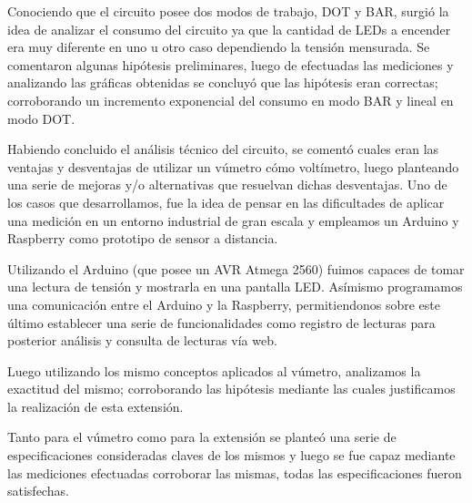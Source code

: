 \documentclass[12pt,a4paper]{article}
\begin{document}
	Conociendo que el circuito posee dos modos de trabajo, DOT y BAR, surgió la idea de analizar el consumo del circuito ya que la cantidad de LEDs a encender era muy diferente en uno u otro caso dependiendo la tensión mensurada. Se comentaron algunas hipótesis preliminares, luego de efectuadas las mediciones y analizando las gráficas obtenidas se concluyó que las hipótesis eran correctas; corroborando un incremento exponencial del consumo en modo BAR y lineal en modo DOT.

	Habiendo concluido el análisis técnico del circuito, se comentó cuales eran las ventajas y desventajas de utilizar un vúmetro cómo voltímetro, luego planteando una serie de mejoras y/o alternativas que resuelvan dichas desventajas. Uno de los casos que desarrollamos, fue la idea de pensar en las dificultades de aplicar una medición en un entorno industrial de gran escala y empleamos un Arduino y Raspberry como prototipo de sensor a distancia.

	Utilizando el Arduino (que posee un AVR Atmega 2560) fuimos capaces de tomar una lectura de tensión y mostrarla en una pantalla LED. Asímismo programamos una comunicación entre el Arduino y la Raspberry, permitiendonos sobre este último establecer una serie de funcionalidades como registro de lecturas para posterior análisis y consulta de lecturas vía web.

	Luego utilizando los mismo conceptos aplicados al vúmetro, analizamos la exactitud del mismo; corroborando las hipótesis mediante las cuales justificamos la realización de esta extensión.

	Tanto para el vúmetro como para la extensión se planteó una serie de especificaciones consideradas claves de los mismos y luego se fue capaz mediante las mediciones efectuadas corroborar las mismas, todas las especificaciones fueron satisfechas.

	\newpage\null\thispagestyle{empty}\newpage
\end{document}
